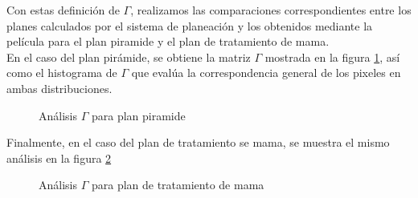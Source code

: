 Con estas definición de $\Gamma$, realizamos las comparaciones correspondientes entre los planes calculados por el sistema de planeación y los obtenidos mediante la película para el plan piramide y el plan de tratamiento de mama.\\

En el caso del plan pirámide, se obtiene la matriz $\Gamma$ mostrada en la figura \ref{fig:gammaPiramide}, así como el histograma de $\Gamma$ que evalúa la correspondencia general de los pixeles en ambas distribuciones.\\
\begin{figure}
	\centering
	\caption{Análisis $\Gamma$ para plan piramide }
	\label{fig:gammaPiramide}
\end{figure}

Finalmente, en el caso del plan de tratamiento se mama, se muestra el mismo análisis en la figura \ref{fig:gammaMama}
\begin{figure}
	\centering
	\caption{Análisis $\Gamma$ para plan de tratamiento de mama}
	\label{fig:gammaMama}
\end{figure}




